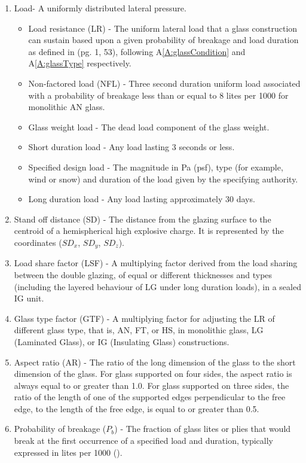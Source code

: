 \documentclass[12pt]{article}
\begin{document}
\begin{enumerate}
\begin{itemize}
\end{itemize}
\item{Load- A uniformly distributed lateral pressure.}
\begin{itemize}
\item{Load resistance (LR) - The uniform lateral load that a glass construction can sustain based upon a given probability of breakage and load duration as defined in \cite{astm2009} (pg. 1, 53), following A\ref{A:glassCondition} and A\ref{A:glassType} respectively.}
\item{Non-factored load (NFL) - Three second duration uniform load associated with a probability of breakage less than or equal to 8 lites per 1000 for monolithic AN glass.}
\item{Glass weight load - The dead load component of the glass weight.}
\item{Short duration load - Any load lasting 3 seconds or less.}
\item{Specified design load - The magnitude in Pa (psf), type (for example, wind or snow) and duration of the load given by the specifying authority.}
\item{Long duration load - Any load lasting approximately 30 days.}
\end{itemize}
\item{Stand off distance (SD) - The distance from the glazing surface to the centroid of a hemispherical high explosive charge. It is represented by the coordinates (${SD_{x}}$, ${SD_{y}}$, ${SD_{z}}$).}
\item{Load share factor (LSF) - A multiplying factor derived from the load sharing between the double glazing, of equal or different thicknesses and types (including the layered behaviour of LG under long duration loads), in a sealed IG unit.}
\item{Glass type factor (GTF) - A multiplying factor for adjusting the LR of different glass type, that is, AN, FT, or HS, in monolithic glass, LG (Laminated Glass), or IG (Insulating Glass) constructions.}
\item{Aspect ratio (AR) - The ratio of the long dimension of the glass to the short dimension of the glass. For glass supported on four sides, the aspect ratio is always equal to or greater than 1.0. For glass supported on three sides, the ratio of the length of one of the supported edges perpendicular to the free edge, to the length of the free edge, is equal to or greater than 0.5.}
\item{Probability of breakage (${P_{b}}$) - The fraction of glass lites or plies that would break at the first occurrence of a specified load and duration, typically expressed in lites per 1000 (\cite{astm2016}).}
\end{enumerate}
\end{document}
